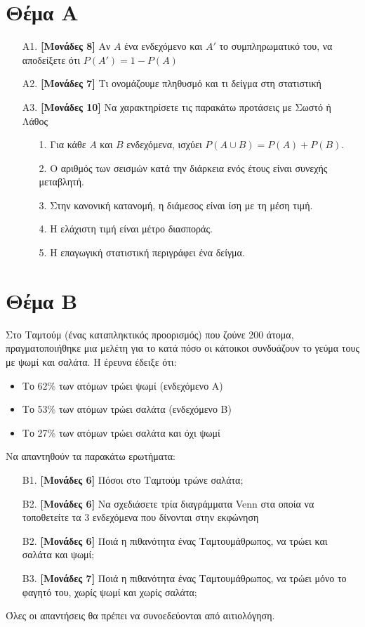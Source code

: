 \documentclass[12pt]{article}
\begin{document}
\section*{Θέμα Α}
\begin{enumerate}
 \item[Α1.] \textbf{[Μονάδες 8]} Αν $Α$ ένα ενδεχόμενο και $Α'$ το συμπληρωματικό του, να αποδείξετε ότι $P(Α')=1-P(Α)$
 \item[Α2.] \textbf{[Μονάδες 7]} Τι ονομάζουμε πληθυσμό και τι δείγμα στη στατιστική
 \item[Α3.] \textbf{[Μονάδες 10]} Να χαρακτηρίσετε τις παρακάτω προτάσεις με Σωστό ή Λάθος

 \begin{enumerate}
  \item[1.] Για κάθε $A$ και $B$ ενδεχόμενα, ισχύει $P(A\cup B)=P(A)+P(B)$.
  \item[2.] Ο αριθμός των σεισμών κατά την διάρκεια ενός έτους είναι συνεχής μεταβλητή.
  \item[3.] Στην κανονική κατανομή, η διάμεσος είναι ίση με τη μέση τιμή.
  \item[4.] Η ελάχιστη τιμή είναι μέτρο διασποράς.
  \item[5.] Η επαγωγική στατιστική περιγράφει ένα δείγμα.
 \end{enumerate}
\end{enumerate}

\section*{Θέμα Β}
Στο Ταμτούμ (ένας καταπληκτικός προορισμός) που ζούνε 200 άτομα, πραγματοποιήθηκε μια μελέτη για το κατά πόσο οι κάτοικοι συνδυάζουν το γεύμα τους με ψωμί και σαλάτα. Η έρευνα έδειξε ότι:
\begin{itemize}
 \item Το 62\% των ατόμων τρώει ψωμί (ενδεχόμενο Α)
 \item Το 53\% των ατόμων τρώει σαλάτα (ενδεχόμενο Β)
 \item Το 27\% των ατόμων τρώει σαλάτα και όχι ψωμί
\end{itemize}
Να απαντηθούν τα παρακάτω ερωτήματα:
\begin{enumerate}
 \item[Β1.] \textbf{[Μονάδες 6]} Πόσοι στο Ταμτούμ τρώνε σαλάτα;
 \item[Β2.] \textbf{[Μονάδες 6]} Να σχεδιάσετε τρία διαγράμματα Venn στα οποία να τοποθετείτε τα 3 ενδεχόμενα που δίνονται στην εκφώνηση
 \item[Β2.] \textbf{[Μονάδες 6]} Ποιά η πιθανότητα ένας Ταμτουμάθρωπος, να τρώει και σαλάτα και ψωμί;
 \item[Β3.] \textbf{[Μονάδες 7]} Ποιά η πιθανότητα ένας Ταμτουμάθρωπος, να τρώει μόνο το φαγητό του, χωρίς ψωμί και χωρίς σαλάτα;
\end{enumerate}
Όλες οι απαντήσεις θα πρέπει να συνοεδεύονται από αιτιολόγηση.
\end{document}
